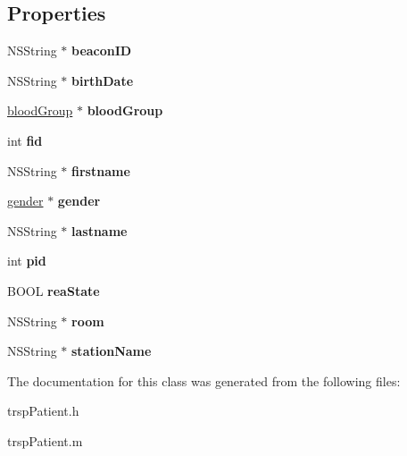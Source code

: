 \subsection*{Properties}
\begin{DoxyCompactItemize}
\item 
\hypertarget{interfacetrsp_patient_a1fb6a586a76b104b1ee2ecfbced79c8a}{}N\+S\+String $\ast$ {\bfseries beacon\+I\+D}\label{interfacetrsp_patient_a1fb6a586a76b104b1ee2ecfbced79c8a}

\item 
\hypertarget{interfacetrsp_patient_acdf7c641dc7478e2cc64bc01f8eec709}{}N\+S\+String $\ast$ {\bfseries birth\+Date}\label{interfacetrsp_patient_acdf7c641dc7478e2cc64bc01f8eec709}

\item 
\hypertarget{interfacetrsp_patient_a5a2c09bde6a9958d53a5cde6fb45fcd9}{}\hyperlink{interfaceblood_group}{blood\+Group} $\ast$ {\bfseries blood\+Group}\label{interfacetrsp_patient_a5a2c09bde6a9958d53a5cde6fb45fcd9}

\item 
\hypertarget{interfacetrsp_patient_a6369e7e553bf1db967860ba41468baec}{}int {\bfseries fid}\label{interfacetrsp_patient_a6369e7e553bf1db967860ba41468baec}

\item 
\hypertarget{interfacetrsp_patient_a04db66f48c11b02c9d6e9e53a050b072}{}N\+S\+String $\ast$ {\bfseries firstname}\label{interfacetrsp_patient_a04db66f48c11b02c9d6e9e53a050b072}

\item 
\hypertarget{interfacetrsp_patient_a3ad6cfe202e5421ef51e03937e4b5605}{}\hyperlink{interfacegender}{gender} $\ast$ {\bfseries gender}\label{interfacetrsp_patient_a3ad6cfe202e5421ef51e03937e4b5605}

\item 
\hypertarget{interfacetrsp_patient_af432adc13c131cd5a88115af75a39eda}{}N\+S\+String $\ast$ {\bfseries lastname}\label{interfacetrsp_patient_af432adc13c131cd5a88115af75a39eda}

\item 
\hypertarget{interfacetrsp_patient_a045b8b1e1d30083cea3d2b228cbf43a8}{}int {\bfseries pid}\label{interfacetrsp_patient_a045b8b1e1d30083cea3d2b228cbf43a8}

\item 
\hypertarget{interfacetrsp_patient_ac9af3d28e692447a79e8241867729e16}{}B\+O\+O\+L {\bfseries rea\+State}\label{interfacetrsp_patient_ac9af3d28e692447a79e8241867729e16}

\item 
\hypertarget{interfacetrsp_patient_ae541619d821b59d11dd66011fbf7662d}{}N\+S\+String $\ast$ {\bfseries room}\label{interfacetrsp_patient_ae541619d821b59d11dd66011fbf7662d}

\item 
\hypertarget{interfacetrsp_patient_ac3765632f1a0871307542a45ea9ca88b}{}N\+S\+String $\ast$ {\bfseries station\+Name}\label{interfacetrsp_patient_ac3765632f1a0871307542a45ea9ca88b}

\end{DoxyCompactItemize}


The documentation for this class was generated from the following files\+:\begin{DoxyCompactItemize}
\item 
trsp\+Patient.\+h\item 
trsp\+Patient.\+m\end{DoxyCompactItemize}
